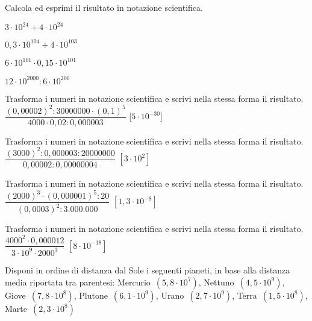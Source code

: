 
\begin{esercizio}
 \label{ese:3.66}
Calcola ed esprimi il risultato in notazione scientifica.
\begin{multicols}{2}
\begin{enumeratea}
\item $3\cdot10^{24} +4\cdot10^{24}$
\item $0,3\cdot10^{104} +4\cdot10^{103}$
\item $6\cdot10^{101}\cdot0,15\cdot10^{101}$
\item $12\cdot10^{2000}:6\cdot10^{200}$
\end{enumeratea}
\end{multicols}
\end{esercizio}

\begin{esercizio}[\Ast]
 \label{ese:3.67}
Trasforma i numeri in notazione scientifica e scrivi nella stessa forma il 
risultato.
\(\dfrac{(0,00002)^2:30000000\cdot(0,1)^5}{4000 \cdot0,02:0,000003}\)
\hfill [\(5\cdot10^{-30}\)]
\end{esercizio}

\begin{esercizio}[\Ast]
 \label{ese:3.68}
Trasforma i numeri in notazione scientifica e scrivi nella stessa forma il 
risultato.
\(\dfrac{(3000)^2:0,000003:20000000}{0,00002:0,00000004}\)
\hfill \(\left[3\cdot10^2 \right]\)
\end{esercizio}

\begin{esercizio}[\Ast]
 \label{ese:3.69}
Trasforma i numeri in notazione scientifica e scrivi nella stessa forma il 
risultato.
\(\dfrac{(2000)^3 \cdot (0,000001)^5:20}{(0,0003)^2:3.000.000}\)
\hfill \(\left[1,3\cdot10^{-8} \right]\)
\end{esercizio}

\begin{esercizio}[\Ast]
 \label{ese:3.70}
Trasforma i numeri in notazione scientifica e scrivi nella stessa forma il 
risultato.
\(\dfrac{4000^2\cdot 0,000012}{3\cdot 10^9\cdot 2000^3}\)
\hfill \(\left[8\cdot10^{-18} \right]\)
\end{esercizio}

\begin{esercizio}
 \label{ese:3.71}
Disponi in ordine di distanza dal Sole i seguenti pianeti, in base alla 
distanza media riportata
tra parentesi: Mercurio~$(5,8\cdot10^7)$, Nettuno~$(4,5\cdot10^9)$, 
Giove~$(7,8\cdot10^8)$,
Plutone~$(6,1\cdot10^9)$, Urano~$(2,7\cdot10^9)$, Terra~$(1,5\cdot10^8)$, 
Marte~$(2,3\cdot10^8)$
\end{esercizio}

